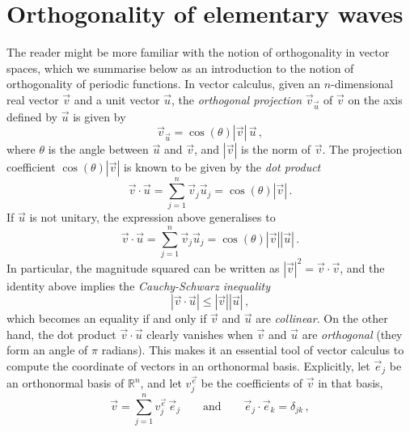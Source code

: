 \section{Orthogonality of elementary waves}
\label{sec:ew-orth}
The reader might be more familiar with the notion of orthogonality in vector spaces, which
we summarise below as an introduction to the notion of orthogonality of periodic
functions. In vector calculus, given an $n$-dimensional real vector $\vec{v}$ and a unit
vector $\vec{u}$, the \emph{orthogonal projection} $\vec{v}_{\vec{u}}$ of $\vec{v}$ on the
axis defined by $\vec{u}$ is given by
\begin{equation}
  \label{eq:orth-proj}
  \vec{v}_{\vec{u}}=\cos(\theta)|\vec{v}|\,\vec{u}\,,
\end{equation}
where $\theta$ is the angle between $\vec{u}$ and $\vec{v}$, and $|\vec{v}|$ is the norm
of $\vec{v}$. The projection coefficient $\cos(\theta)|\vec{v}|$ is known to be given by
the
\emph{dot product}
\begin{equation}
  \vec{v}\cdot \vec{u}=\sum_{j=1}^n \vec{v}_j \vec{u}_j=\cos(\theta)|\vec{v}|\,.
\end{equation}
If $\vec{u}$ is not unitary, the expression above generalises to
\begin{equation}
  \vec{v}\cdot \vec{u}=\sum_{j=1}^n \vec{v}_j \vec{u}_j=\cos(\theta)|\vec{v}||\vec{u}|\,.
  \label{eq:vec-dot}
\end{equation}
In particular, the magnitude squared can be written as $|\vec{v}|^2=\vec{v}\cdot \vec{v}$,
and the identity above implies the \emph{Cauchy-Schwarz inequality}
\begin{equation}
  |\vec{v}\cdot \vec{u}|\leq|\vec{v}||\vec{u}|\,,\label{eq:cs-vec}
\end{equation}
which becomes an equality if and only if $\vec{v}$ and $\vec{u}$ are \emph{collinear}. On
the other hand, the dot product $\vec{v}\cdot \vec{u}$ clearly vanishes when $\vec{v}$ and
$\vec{u}$ are \emph{orthogonal} (\ie they form an angle of $\pi$ radians). This makes it
an essential tool of vector calculus to compute the coordinate of vectors in an
orthonormal basis. Explicitly, let $\vec{e}_j$ be an orthonormal basis of $\mathbb{R}^n$,
and let $v^{\vec{e}}_j$ be the coefficients of $\vec{v}$ in that basis, \ie
\begin{equation}
  \vec{v}=\sum_{j=1}^{n}v^{\vec{e}}_j\,\vec{e}_j\qquad\text{and}\qquad
  \vec{e}_j\cdot\vec{e}_k=\delta_{jk}\,,
\end{equation}
